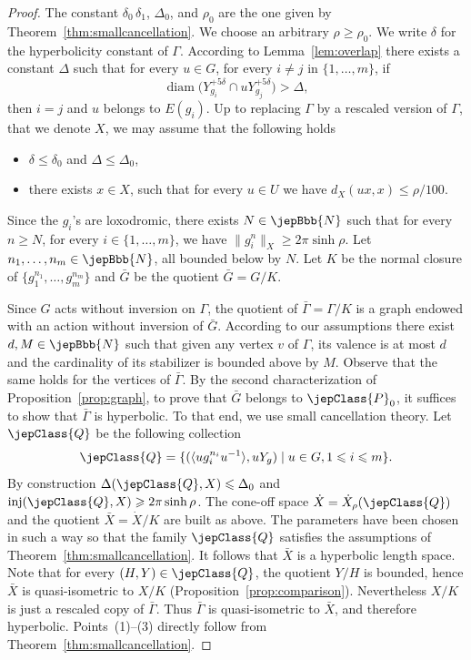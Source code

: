 \begin{proof}
The constant $\delta_0\,\delta_1$, $\Delta_0$, and $\rho_0$ are the one given by Theorem~\ref{thm:smallcancellation}. We choose an arbitrary $\rho\geqslant\rho_0$. We write $\delta$ for the hyperbolicity constant of $\Gamma$. According to Lemma~\ref{lem:overlap} there exists a constant $\Delta$ such that for every $u\in G$, for every $i\neq j$ in $\{1,\ldots,m\}$, if
\[
\operatorname{diam}\bigl(Y_{g_i}^{+5\delta}\cap uY_{g_j}^{+5\delta}\bigr)>\Delta,
\]
then $i=j$ and $u$ belongs to $E(g_i)$. Up to replacing $\Gamma$ by a rescaled version of $\Gamma$, that we denote $X$, we may assume that the following holds
\begin{itemize}
\item $\delta\leqslant\delta_0$ and $\Delta\leqslant\Delta_0$,
\item there exists $x\in X$, such that for every $u\in U$ we have $d_X(ux,x)\leqslant\rho/100$.
\end{itemize}
Since the $g_i$'s are loxodromic, there exists $N\in\jepBbb{N}$ such that for every $n\geqslant N$, for every $i\in\{1,\ldots,m\}$, we have $\|g_i^n\|_X\geqslant2\pi\sinh\rho$. Let $n_1,\ldots,n_m\in\jepBbb{N}$, all bounded below by $N$. Let $K$ be the normal closure of $\{g_1^{n_1},\ldots,g_m^{n_m}\}$ and $\bar G$ be the quotient $\bar G=G/K$.

Since $G$ acts without inversion on $\Gamma$, the quotient of $\bar\Gamma=\Gamma/K$ is a graph endowed with an action without inversion of $\bar G$. According to our assumptions there exist $d,M\in\jepBbb{N}$ such that given any vertex $v$ of $\Gamma$, its valence is at most $d$ and the cardinality of its stabilizer is bounded above by $M$. Observe that the same holds for the vertices of $\bar\Gamma$. By the second characterization of Proposition~\ref{prop:graph}, to prove that $\bar G$ belongs to $\jepClass{P}_0$, it suffices to show that $\bar\Gamma$ is hyperbolic. To that end, we use small cancellation theory. Let $\jepClass{Q}$ be the following collection
\[
\jepClass{Q}=\{(\langle ug_i^{n_i}u^{-1}\rangle,uY_g)\mid u\in G,1\leqslant i\leqslant m\}.
\]
By construction $\Delta(\jepClass{Q},X)\leqslant\Delta_0$ and $\operatorname{inj}(\jepClass{Q},X)\geqslant2\pi\sinh\rho$. The cone-off space $\dot X=\dot X_\rho(\jepClass{Q})$ and the quotient $\bar X=\dot X/K$ are built as above. The parameters have been chosen in such a way so that the family $\jepClass{Q}$ satisfies the assumptions of Theorem~\ref{thm:smallcancellation}. It follows that $\bar X$ is a hyperbolic length space. Note that for every $(H,Y)\in\jepClass{Q}$,
the quotient $Y/H$ is bounded, hence $\bar X$ is quasi-isometric to $X/K$ (Proposition~\ref{prop:comparison}). Nevertheless $X/K$ is just a rescaled copy of $\bar\Gamma$. Thus $\bar\Gamma$ is quasi-isometric to $\bar X$, and therefore hyperbolic. Points~(1)--(3) directly follow from Theorem~\ref{thm:smallcancellation}.
\end{proof}

